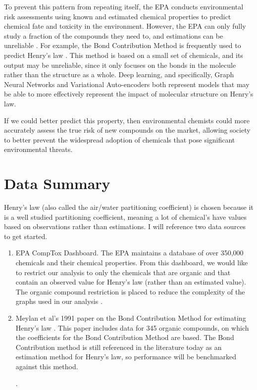 \documentclass[12pt, oneside]{article}   	%
\begin{document}
To prevent this pattern from repeating itself, the EPA conducts environmental risk assessments using known and estimated chemical properties to predict chemical fate and toxicity in the environment. However, the EPA can only fully study a fraction of the compounds they need to, and estimations can be unreliable \cite{burton}. For example, the Bond Contribution Method is frequently used to predict Henry's law \cite{meylan}. This method is based on a small set of chemicals, and its output may be unreliable, since it only focuses on the bonds in the molecule rather than the structure as a whole. Deep learning, and specifically, Graph Neural Networks and Variational Auto-encoders both represent models that may be able to more effectively represent the impact of molecular structure on Henry's law.

If we could better predict this property, then environmental chemists could more accurately assess the true risk of new compounds on the market, allowing society to better prevent the widespread adoption of chemicals that pose significant environmental threats.

\section{Data Summary}
Henry's law (also called the air/water partitioning coefficient) is chosen because it is a well studied partitioning coefficient, meaning a lot of chemical's have values based on observations rather than estimations. I will reference two data sources to get started.
\begin{enumerate}
\item EPA CompTox Dashboard. The EPA maintains a database of over 350,000 chemicals and their chemical properties. From this dashboard, we would like to restrict our analysis to only the chemicals that are organic and that contain an observed value for Henry's law (rather than an estimated value). The organic compound restriction is placed to reduce the complexity of the graphs used in our analysis \cite{epa-comptox}. 
\item Meylan et al's 1991 paper on the Bond Contribution Method for estimating Henry's law \cite{meylan}. This paper includes data for 345 organic compounds, on which the coefficients for the Bond Contribution Method are based. The Bond Contribution method is still referenced in the literature today as an estimation method for Henry's law, so performance will be benchmarked against this method. 

.%
\end{enumerate}
\end{document}
